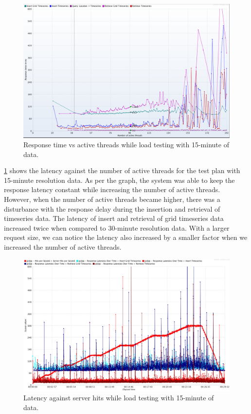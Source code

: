 \begin{figure}[htp]
    \centering
    \includegraphics[width=1.0\textwidth]{results/obs/all/obs_all_15m_response_times_vs_threads.png}
    \caption{Response time vs active threads while load testing with 15-minute of data.}
    \label{fi:test_obs_all_15m_response_vs_threads}
\end{figure}

\cref{fi:test_obs_all_15m_response_vs_threads} shows the latency against the number of active threads for the test plan with 15-minute resolution data. As per the graph, the system was able to keep the response latency constant while increasing the number of active threads. However, when the number of active threads became higher, there was a disturbance with the response delay during the insertion and retrieval of timeseries data. The latency of insert and retrieval of grid timeseries data increased twice when compared to 30-minute resolution data. With a larger request size, we can notice the latency also increased by a smaller factor when we increased the number of active threads. 

\begin{figure}[htp]
    \centering
    \includegraphics[width=1.0\textwidth]{results/obs/all/obs_all_15m_res_latencies_against_hits.png}
    \caption{Latency against server hits while load testing with 15-minute of data.}
    \label{fi:test_obs_all_15m_latency}
\end{figure}

